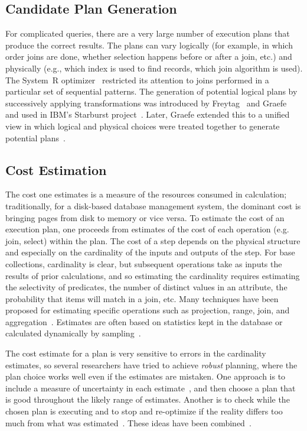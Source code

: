 \subsection{Candidate Plan Generation} \label{sec:candidate-plan-generation}
For complicated queries, there are a very large number of execution plans that produce the correct results. The plans can vary logically (for example, in which order joins are done, whether selection happens before or after a join, etc.) and physically (e.g., which index is used to find records, which join algorithm is used). The System~R optimizer~\cite{SelingerACLP79} restricted its attention to joins performed in a particular set of sequential patterns. The generation of potential logical plans by successively applying transformations was introduced by Freytag~\cite{Freytag87} and Graefe~\cite{GraefeD87} and used in IBM's Starburst project~\cite{HaasFLP89, PiraheshHH92}.  Later, Graefe extended this to a unified view in which logical and physical choices were treated together to generate potential plans~\cite{Graefe95a}.

\subsection{Cost Estimation}
The cost one estimates is a measure of the resources consumed in calculation; traditionally, for a disk-based database management system, the dominant cost is bringing pages from disk to memory or vice versa. To estimate the cost of an execution plan, one proceeds from estimates of the cost of each operation (e.g. join, select) within the plan. The cost of a step depends on the physical structure and especially on the cardinality of the inputs and outputs of the step. For base collections, cardinality is clear, but subsequent operations take as inputs the results of prior calculations, and so estimating the cardinality requires estimating the selectivity of predicates, the number of distinct values in an attribute, the probability that items will match in a join, etc. Many techniques have been proposed for estimating specific operations such as projection, range, join, and aggregation~\cite{ahad1989estimating, HaasNSS96, PoosalaIHS96, MarklMKTHS05}. Estimates are often based on statistics kept in the database or calculated dynamically by sampling~\cite{olken1995random}.

The cost estimate for a plan is very sensitive to errors in the cardinality estimates, so several researchers have tried to achieve \emph{robust} planning, where the plan choice works well even if the estimates are mistaken. One approach is to include a measure of uncertainty in each estimate~\cite{babcock2005towards}, and then choose a plan that is good throughout the likely range of estimates. Another is to check while the chosen plan is executing and to stop and re-optimize if the reality differs too much from what was estimated~\cite{markl2004robust}. These ideas have been combined~\cite{babu2005proactive}.

